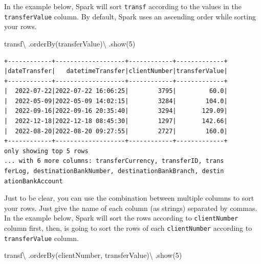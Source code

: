 \documentclass[
  11pt,
  letterpaper,
  DIV=11,
  numbers=noendperiod]{scrreprt}
\newenvironment{Shaded}{\begin{snugshade}}{\end{snugshade}}
\newcommand{\DecValTok}[1]{\textcolor[rgb]{0.68,0.00,0.00}{#1}}
\newcommand{\NormalTok}[1]{\textcolor[rgb]{0.00,0.23,0.31}{#1}}
\newcommand{\OperatorTok}[1]{\textcolor[rgb]{0.37,0.37,0.37}{#1}}
\newcommand{\StringTok}[1]{\textcolor[rgb]{0.13,0.47,0.30}{#1}}
\begin{document}
In the example below, Spark will sort \texttt{transf} according to the
values in the \texttt{transferValue} column. By default, Spark uses an
ascending order while sorting your rows.

\begin{Shaded}
\begin{Highlighting}[]
\NormalTok{transf}\OperatorTok{\textbackslash{}}
\NormalTok{  .orderBy(}\StringTok{\textquotesingle{}transferValue\textquotesingle{}}\NormalTok{)}\OperatorTok{\textbackslash{}}
\NormalTok{  .show(}\DecValTok{5}\NormalTok{)}
\end{Highlighting}
\end{Shaded}

\begin{verbatim}
+------------+-------------------+------------+-------------+
|dateTransfer|   datetimeTransfer|clientNumber|transferValue|
+------------+-------------------+------------+-------------+
|  2022-07-22|2022-07-22 16:06:25|        3795|         60.0|
|  2022-05-09|2022-05-09 14:02:15|        3284|        104.0|
|  2022-09-16|2022-09-16 20:35:40|        3294|       129.09|
|  2022-12-18|2022-12-18 08:45:30|        1297|       142.66|
|  2022-08-20|2022-08-20 09:27:55|        2727|        160.0|
+------------+-------------------+------------+-------------+
only showing top 5 rows
... with 6 more columns: transferCurrency, transferID, trans
ferLog, destinationBankNumber, destinationBankBranch, destin
ationBankAccount
\end{verbatim}

Just to be clear, you can use the combination between multiple columns
to sort your rows. Just give the name of each column (as strings)
separated by commas. In the example below, Spark will sort the rows
according to \texttt{clientNumber} column first, then, is going to sort
the rows of each \texttt{clientNumber} according to
\texttt{transferValue} column.

\begin{Shaded}
\begin{Highlighting}[]
\NormalTok{transf}\OperatorTok{\textbackslash{}}
\NormalTok{  .orderBy(}\StringTok{\textquotesingle{}clientNumber\textquotesingle{}}\NormalTok{, }\StringTok{\textquotesingle{}transferValue\textquotesingle{}}\NormalTok{)}\OperatorTok{\textbackslash{}}
\NormalTok{  .show(}\DecValTok{5}\NormalTok{)}
\end{Highlighting}
\end{Shaded}
\end{document}
